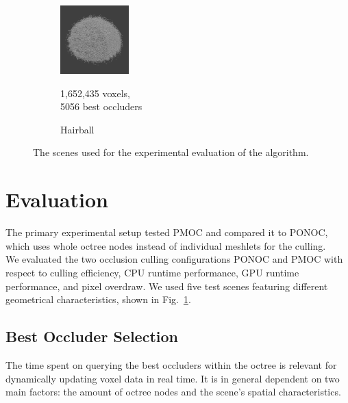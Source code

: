 \documentclass[conference]{IEEEtran}
\begin{document}
\begin{figure}
\begin{subfigure}{100px}
    \end{subfigure}
    \begin{subfigure}{100px}
        \includegraphics[width=100px]{images/model-hairball.jpg}
        \caption{Hairball}
        \parbox{\linewidth}{\centering\footnotesize 1,652,435 voxels,\\ 5056 best occluders}
    \end{subfigure}
    
    \caption{The scenes used for the experimental evaluation of the algorithm.}
    \label{fig:models}
\end{figure}

\section{Evaluation} \label{sec-evaluation}

\noindent   %
The primary experimental setup tested \ac{PMOC} and compared it to \ac{PONOC}, which uses whole 
octree nodes instead of individual meshlets for the culling. \\

\noindent
We evaluated the two occlusion culling configurations \ac{PONOC} and \ac{PMOC} with respect to culling 
efficiency, \ac{CPU} runtime performance, \ac{GPU} runtime performance, and pixel overdraw. We used five 
test scenes featuring different geometrical characteristics, shown in Fig.~\ref{fig:models}. 


\subsection{Best Occluder Selection} \label{subsec-best-occluder-selection}

\noindent
The time spent on querying the best occluders within the octree is relevant for dynamically updating 
voxel data in real time. It is in general dependent on two main factors: the amount of octree nodes 
and the scene's spatial characteristics. \\
\end{document}
